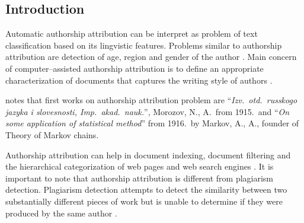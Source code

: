 \documentclass[11pt,english]{article}
\newcommand{\engl}[1]{(engl.~\emph{#1})}
\begin{document}
\begin{multicols}{2}
\section{Introduction}
Automatic authorship attribution can be interpret as problem of text
classification based on its lingvistic features. Problems similar to authorship
attribution are detection of age, region and gender of the author
\citep{luyckx2005shallow}. Main concern of computer--assisted authorship
attribution is to define an appropriate characterization of documents that
captures the writing style of authors \citep{coyotl2006authorship}.

\citet{kukushkina2001using} notes that first works on authorship attribution
problem are ``\emph{Izv.\ otd.\ russkogo jazyka i slovesnosti, Imp.\ akad.\ nauk.}'',
Morozov, N., A.\ from 1915.\  and ``\emph{On some application of statistical
method}'' from 1916.\ by Markov, A., A., founder of Theory of Markov chains.

Authorship attribution can help in document indexing, document filtering and the
hierarchical categorization of web pages and web search engines
\citep{luyckx2005shallow}. It is important to note that authorship attribution is
different from plagiarism detection. Plagiarism detection attempts to detect the
similarity between two substantially different pieces of work but is unable to
determine if they were produced by the same author \citep{de2001mining}.


\end{multicols}
\end{document}
